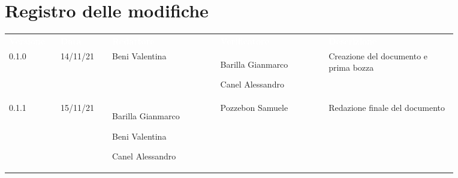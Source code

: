 \section*{Registro delle modifiche}

{\renewcommand{\arraystretch}{1.5}
\begin{tabular}{p{0.10\linewidth}p{0.10\linewidth}p{0.21\linewidth}p{0.21\linewidth}p{0.25\linewidth}}
	\rowcolor[RGB]{33, 73, 50}
	\textcolor{white}{\textbf{Versione}} & \textcolor{white}{\textbf{Data}} & \textcolor{white}
	{\textbf{Redattore}} & \textcolor{white}{\textbf{Verificatore}} & \textcolor{white}
	{\textbf{Descrizione}}\\
	\rowcolor[RGB]{216, 235, 171}
	0.1.0 & 14/11/21 & Beni Valentina & Barilla Gianmarco \par Canel Alessandro & Creazione del documento e prima bozza\\
	\rowcolor[RGB]{233, 245, 206}
	0.1.1 & 15/11/21 & Barilla Gianmarco \par  Beni Valentina  \par Canel Alessandro & Pozzebon Samuele & Redazione finale del documento\\
	
\end{tabular}	
}